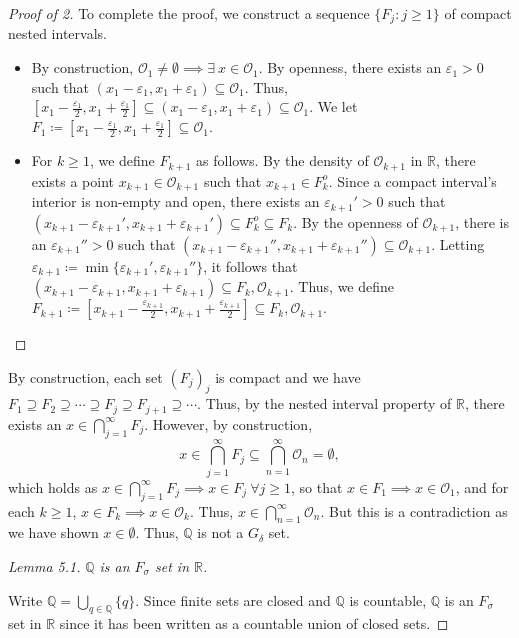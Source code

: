 \begin{proof}[Proof of 2]
	To complete the proof, we construct a sequence \( \{ F_j : j \geq 1\}   \) of compact nested intervals.
	\begin{itemize}
		\item By construction, \( \mathcal{O}_1 \neq \emptyset  \implies \exists \ x \in \mathcal{O}   _1\). By openness, there exists an \( \varepsilon_1 > 0  \) such that \( (x_1 - \varepsilon_1, x_1 + \varepsilon_1  ) \subseteq \mathcal{O}_1.  \) Thus, \( [x_1 - \frac{\varepsilon_1 }{2}, x_1 + \frac{\varepsilon_1 }{2}] \subseteq (x_1 - \varepsilon_1, x_1 + \varepsilon_1 ) \subseteq \mathcal{O}_1    \). We let \( F_1 \coloneqq  [x_1 - \frac{\varepsilon_1 }{2}, x_1 + \frac{\varepsilon_1 }{2}] \subseteq \mathcal{O} _1\).
		\item For \( k \geq 1 \), we define \( F_{k+1}  \) as follows. By the density of \( \mathcal{O}_{k+1}   \) in \( \mathbb{R} \), there exists a point \( x_{k+1} \in \mathcal{O}_{k+1}   \) such that \( x_{k+1} \in F_k^{o} .  \) Since a compact interval's interior is non-empty and open, there exists an \( \varepsilon_{k+1}' > 0  \) such that \((x_{k+1} - \varepsilon_{k+1}', x_{k+1} + \varepsilon _{k+1}' ) \subseteq F^{o}_k \subseteq F_k \). By the openness of \( \mathcal{O}_{k+1}   \), there is an \( \varepsilon_{k+1}'' > 0  \) such that \( (x_{k+1} - \varepsilon_{k+1}'', x_{k+1} + \varepsilon _{k+1}'' ) \subseteq \mathcal{O} _{k+1}  \). Letting \( \varepsilon_{k+1} \coloneqq \min \{ \varepsilon_{k+1}', \varepsilon_{k+1}''   \}   \), it follows that \( (x_{k+1} - \varepsilon_{k+1}, x_{k+1} + \varepsilon _{k+1} ) \subseteq F_k, \mathcal{O}_{k+1}    \). Thus, we define \( F_{k+1} \coloneqq [x_{k+1} - \frac{\varepsilon_{k+1}}{2}, x_{k+1} + \frac{\varepsilon _{k+1}}{2}  ] \subseteq F_k, \mathcal{O}_{k+1} .  \)
		
		
	\end{itemize}

\end{proof}
By construction, each set \( (F_j)_j \) is compact and we have \( F_{1} \supseteq F_2 \supseteq \cdots  \supseteq F_j \supseteq F_{j+1} \supseteq \cdots .   \) Thus, by the nested interval property of \( \mathbb{R} \), there exists an \( x \in \bigcap_{j=1}^{\infty} F_j \). However, by construction, \[x \in  \bigcap_{j=1}^{\infty} F_j \subseteq \bigcap_{n=1}^{\infty} \mathcal{O}_n = \emptyset, \] which holds as \( x \in \bigcap_{j=1}^{\infty} F_j \implies x \in F_j \ \forall j \geq 1 \), so that \( x \in F_1 \implies x \in \mathcal{O}_1  \), and for each \( k \geq 1 \), \( x \in F_{k} \implies x \in \mathcal{O} _{k}  \). Thus, \( x \in \bigcap_{n=1}^{\infty} \mathcal{O} _n \). But this is a contradiction as we have shown \( x \in \emptyset  \). Thus, \( \mathbb{Q}  \) is not a \( G_\delta  \) set.
\begin{proof}[Lemma 5.1]
\emph{\(\mathbb{Q}\) is an \( F_\sigma  \) set in \( \mathbb{R} \).} 

Write \(\mathbb{Q}  = \bigcup_{q \in \mathbb{Q} }^{} \{ q \}.\) Since finite sets are closed and \( \mathbb{Q}  \) is countable, \( \mathbb{Q}  \) is an \( F_\sigma  \) set in \( \mathbb{R} \) since it has been written as a countable union of closed sets. \end{proof}
